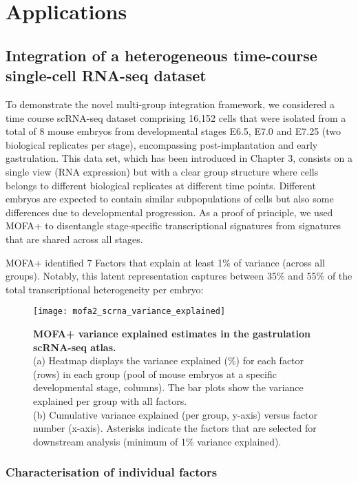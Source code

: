 \section{Applications}

\subsection{Integration of a heterogeneous time-course single-cell RNA-seq dataset}

To demonstrate the novel multi-group integration framework, we considered a time course scRNA-seq dataset comprising 16,152 cells that were isolated from a total of 8 mouse embryos from developmental stages E6.5, E7.0 and E7.25 (two biological replicates per stage), encompassing post-implantation and early gastrulation\cite{Pijuan-Sala2019}. This data set, which has been introduced in Chapter 3, consists on a single view (RNA expression) but with a clear group structure where cells belongs to different biological replicates at different time points. Different embryos are expected to contain similar subpopulations of cells but also some differences due to developmental progression. As a proof of principle, we used MOFA+ to disentangle stage-specific transcriptional signatures from signatures that are shared across all stages. 

MOFA+ identified 7 Factors that explain at least 1\% of variance (across all groups). Notably, this latent representation captures between 35\% and 55\% of the total transcriptional heterogeneity per embryo:

\begin{figure}[H]
	\centering
	\texttt{[image: mofa2\_scrna\_variance\_explained]}
	\caption[]{
	\textbf{MOFA+ variance explained estimates in the gastrulation scRNA-seq atlas.} \\
	(a) Heatmap displays the variance explained (\%) for each factor (rows) in each group (pool of mouse embryos at a specific developmental stage, columns). The bar plots show the variance explained per group with all factors. \\
	(b) Cumulative variance explained (per group, y-axis) versus factor number (x-axis). Asterisks indicate the factors that are selected for downstream analysis (minimum of 1\% variance explained).
	}
	\label{fig:mofa2_scrna_variance_explained}
\end{figure}


\subsubsection{Characterisation of individual factors}

